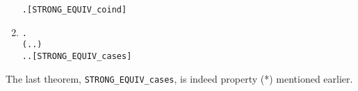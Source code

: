 \begin{enumerate}
\begin{alltt}
   \HOLSymConst{\HOLTokenForall{}} .    \HOLSymConst{\HOLTokenImp{}}  \HOLSymConst{\HOLTokenStrongEQ} \hfill{[STRONG_EQUIV_coind]}
\end{alltt}
\item \begin{alltt}
\HOLTokenTurnstile{}  \HOLSymConst{\HOLTokenStrongEQ}  \HOLSymConst{\HOLTokenEquiv{}}
   \HOLSymConst{\HOLTokenForall{}}.
       (\HOLSymConst{\HOLTokenForall{}}.  \HOLTokenTransBegin{}\HOLTokenTransEnd {} \HOLSymConst{\HOLTokenImp{}} \HOLSymConst{\HOLTokenExists{}}.  \HOLTokenTransBegin{}\HOLTokenTransEnd {} \HOLSymConst{\HOLTokenConj{}}  \HOLSymConst{\HOLTokenStrongEQ} ) \HOLSymConst{\HOLTokenConj{}}
       \HOLSymConst{\HOLTokenForall{}}.  \HOLTokenTransBegin{}\HOLTokenTransEnd {} \HOLSymConst{\HOLTokenImp{}} \HOLSymConst{\HOLTokenExists{}}.  \HOLTokenTransBegin{}\HOLTokenTransEnd {} \HOLSymConst{\HOLTokenConj{}}  \HOLSymConst{\HOLTokenStrongEQ} \hfill{[STRONG_EQUIV_cases]}
\end{alltt}
\end{enumerate}
The last theorem, \texttt{STRONG_EQUIV_cases}, is indeed  property (*)
mentioned earlier.

